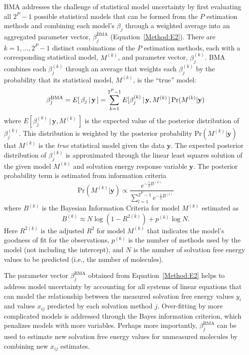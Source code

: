 \documentclass[journal=jpcbfk, manuscript=article]{achemso}
\newcommand{\LG}[1]{\textcolor{black}{#1}}
\newcommand{\+}[1]{\ensuremath{\mathbf{#1}}}
\renewcommand{\vec}[1]{{\mathbf{#1}}}
\begin{document}
BMA addresses the challenge of statistical model uncertainty by first evaluating all $2^{P}-1$ possible statistical models that can be formed from the $P$ estimation methods and combining each model's $\beta_j$ through a weighted average into an aggregated parameter vector, $\beta_j^{\text{BMA}}$ (Equation~\ref{Method:E2}).
There are $k = 1, \ldots, 2^P-1$ distinct combinations of the $P$ estimation methods, each with a corresponding statistical model, $M^{(k)}$, and parameter vector, $\beta^{(k)}_j$. 
BMA combines each $\beta_{j}^{(k)}$ through an average that weights each $\beta^{(k)}_j$ by the probability that its statistical model, $M^{(k)}$, is the ``true'' model:
\begin{equation} \label{Method:E2}
	\LG{\beta_j^{\text{BMA}} = E[\,\beta_j \,|\, \+y\,]  = \sum_{k=1}^{2^P-1} E[\beta_{j}^{(k)}\,|\, \+y,M^{(k)}\,] \, {\mathrm{Pr}}(M^{(k)} | \+y)}
\end{equation}
where $E[\beta_{j}^{(k)}\,|\, \+y,M^{(k)}\,]$ is the expected value of the posterior distribution of $\beta^{(k)}_j$.
This distribution is weighted by the posterior probability ${\mathrm{Pr}}(M^{(k)} | \+y)$ that $M^{(k)}$ is the \emph{true} statistical model given the data $\textbf{y}$.
The expected posterior distribution of $\beta^{(k)}_j$ is approximated through the linear least squares solution of the given model $M^{(k)}$ and solvation energy response variable $\vec{y}$.
The posterior probability term is estimated from information criteria \cite{Raftery:1995}
\begin{equation} \label{Method:E3} 
	{\mathrm{Pr}}(M^{(k)} | \+y) \propto \frac{e^{-\frac{1}{2}B^{(k)}}}{\sum^{2^P-1}_{l=1} e^{-\frac{1}{2}B^{(l)}}} 
\end{equation}
where $B^{(k)}$ is the Bayesian Information Criteria for model $M^{(k)}$ estimated as
\begin{equation} \label{Method:E4} 
	B^{(k)} \approx N \log{(1-R^{2(k)})} + p^{(k)} \log{N}.
\end{equation}
Here $R^{2(k)}$ is the adjusted $R^2$ for model $M^{(k)}$ that indicates the model's goodness of fit for the observations, $p^{(k)}$ is the number of methods used by the model (not including the intercept), and $N$ is the number of solvation free energy values to be predicted (i.e., the number of molecules). 

The parameter vector $\beta_j^{\text{BMA}}$ obtained from Equation~\ref{Method:E2} helps to address model uncertainty by accounting for all systems of linear equations that can model the relationship between the measured solvation free energy values $y_i$ and values $x_{ij}$ predicted by each solvation method $j$.
Over-fitting by more complicated models is addressed through the Bayes information criterion, which penalizes models with more variables.
Perhaps more importantly, $\beta_j^{\text{BMA}}$ can be used to estimate new solvation free energy values for unmeasured molecules by combining new $x_{i j}$ estimates.
\end{document}
